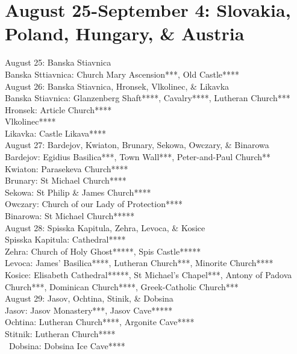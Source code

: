 \section{August 25-September 4: Slovakia, Poland, Hungary, \& Austria}
\label{2023:Slovkia}

August 25: Banska Stiavnica\\

Banska Sttiavnica: Church Mary Ascension***, Old Castle****\\

August 26: Banska Stiavnica, Hronsek, Vlkolinec, \& Likavka\\

Banska Stiavnica: Glanzenberg Shaft****, Cavalry****, Lutheran Church***\\
Hronsek: Article Church****\\
Vlkolinec****\\
Likavka: Castle Likava****\\

August 27: Bardejov, Kwiaton, Brunary, Sekowa, Owczary, \& Binarowa\\

Bardejov: Egidius Basilica***, Town Wall***, Peter-and-Paul Church**\\
Kwiaton: Parasekeva Church****\\
Brunary: St Michael Church****\\
Sekowa: St Philip \& James Church****\\
Owczary: Church of our Lady of Protection****\\
Binarowa: St Michael Church*****\\

August 28: Spisska Kapitula, Zehra, Levoca, \& Kosice\\

Spisska Kapitula: Cathedral****\\
Zehra: Church of Holy Ghost*****, Spis Castle*****\\
Levoca: James' Basilica****, Lutheran Church***, Minorite Church****\\
Kosice: Elisabeth Cathedral*****, St Michael's Chapel***, Antony of Padova Church***, Dominican Church****, Greek-Catholic Church***\\

August 29: Jasov, Ochtina, Stinik, \& Dobsina\\

Jasov: Jasov Monastery***, Jasov Cave*****\\
Ochtina: Lutheran Church****, Argonite Cave****\\
Stitnik: Lutheran Church****\\\
Dobsina:  Dobsina Ice Cave****\\

